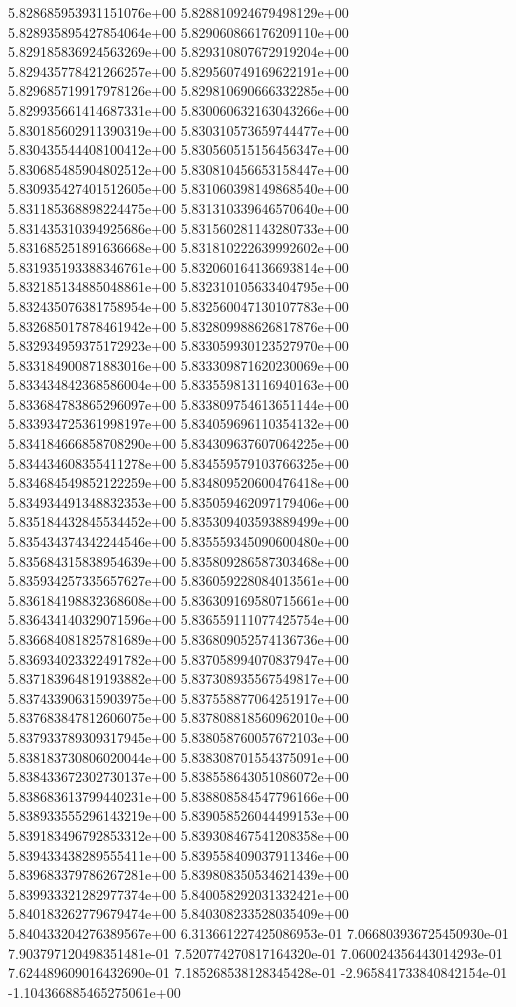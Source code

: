 5.828685953931151076e+00
5.828810924679498129e+00
5.828935895427854064e+00
5.829060866176209110e+00
5.829185836924563269e+00
5.829310807672919204e+00
5.829435778421266257e+00
5.829560749169622191e+00
5.829685719917978126e+00
5.829810690666332285e+00
5.829935661414687331e+00
5.830060632163043266e+00
5.830185602911390319e+00
5.830310573659744477e+00
5.830435544408100412e+00
5.830560515156456347e+00
5.830685485904802512e+00
5.830810456653158447e+00
5.830935427401512605e+00
5.831060398149868540e+00
5.831185368898224475e+00
5.831310339646570640e+00
5.831435310394925686e+00
5.831560281143280733e+00
5.831685251891636668e+00
5.831810222639992602e+00
5.831935193388346761e+00
5.832060164136693814e+00
5.832185134885048861e+00
5.832310105633404795e+00
5.832435076381758954e+00
5.832560047130107783e+00
5.832685017878461942e+00
5.832809988626817876e+00
5.832934959375172923e+00
5.833059930123527970e+00
5.833184900871883016e+00
5.833309871620230069e+00
5.833434842368586004e+00
5.833559813116940163e+00
5.833684783865296097e+00
5.833809754613651144e+00
5.833934725361998197e+00
5.834059696110354132e+00
5.834184666858708290e+00
5.834309637607064225e+00
5.834434608355411278e+00
5.834559579103766325e+00
5.834684549852122259e+00
5.834809520600476418e+00
5.834934491348832353e+00
5.835059462097179406e+00
5.835184432845534452e+00
5.835309403593889499e+00
5.835434374342244546e+00
5.835559345090600480e+00
5.835684315838954639e+00
5.835809286587303468e+00
5.835934257335657627e+00
5.836059228084013561e+00
5.836184198832368608e+00
5.836309169580715661e+00
5.836434140329071596e+00
5.836559111077425754e+00
5.836684081825781689e+00
5.836809052574136736e+00
5.836934023322491782e+00
5.837058994070837947e+00
5.837183964819193882e+00
5.837308935567549817e+00
5.837433906315903975e+00
5.837558877064251917e+00
5.837683847812606075e+00
5.837808818560962010e+00
5.837933789309317945e+00
5.838058760057672103e+00
5.838183730806020044e+00
5.838308701554375091e+00
5.838433672302730137e+00
5.838558643051086072e+00
5.838683613799440231e+00
5.838808584547796166e+00
5.838933555296143219e+00
5.839058526044499153e+00
5.839183496792853312e+00
5.839308467541208358e+00
5.839433438289555411e+00
5.839558409037911346e+00
5.839683379786267281e+00
5.839808350534621439e+00
5.839933321282977374e+00
5.840058292031332421e+00
5.840183262779679474e+00
5.840308233528035409e+00
5.840433204276389567e+00
6.313661227425086953e-01
7.066803936725450930e-01
7.903797120498351481e-01
7.520774270817164320e-01
7.060024356443014293e-01
7.624489609016432690e-01
7.185268538128345428e-01
-2.965841733840842154e-01
-1.104366885465275061e+00

